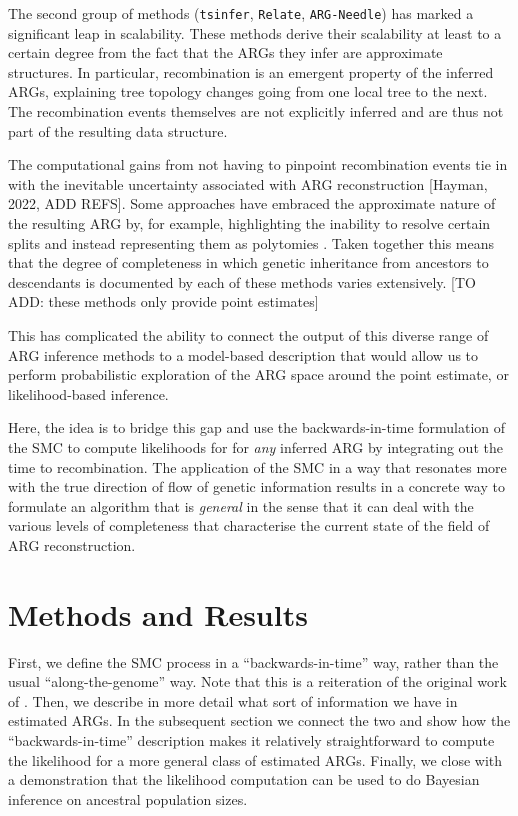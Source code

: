 \documentclass{article}
\newcommand{\tsinfer}[0]{\texttt{tsinfer}}
\newcommand{\argneedle}[0]{\texttt{ARG-Needle}}
\newcommand{\relate}[0]{\texttt{Relate}}
\begin{document}

The second group of methods (\tsinfer, \relate, \argneedle) has marked a significant
leap in scalability. These methods derive their scalability at least to a certain
degree from the fact that the ARGs they infer are approximate structures. In particular,
recombination is an emergent property of the inferred ARGs, explaining tree topology
changes going from one local tree to the next. The recombination events themselves
are not explicitly inferred and are thus not part of the resulting data structure.

The computational gains from not having to pinpoint recombination events tie in
with the inevitable uncertainty associated with ARG reconstruction [Hayman, 2022, ADD REFS].
Some approaches have embraced the approximate nature of the resulting ARG by, for
example, highlighting the inability to resolve certain splits and instead representing
them as polytomies \citep{kelleher_inferring_2019}. Taken together this means that the
degree of completeness in which genetic inheritance from ancestors to descendants is documented
by each of these methods varies extensively.
[TO ADD: these methods only provide point estimates]


This has complicated the ability to connect the output of this diverse range of
ARG inference methods to a model-based description that would allow us to perform
probabilistic exploration of the ARG space around the point estimate,
or likelihood-based inference.

Here, the idea is to bridge this gap and use the backwards-in-time formulation of the SMC
to compute likelihoods for for \textit{any} inferred ARG
by integrating out the time to recombination.
The application of the SMC in a way that resonates more
with the true direction of flow of genetic information
results in a concrete way to formulate an algorithm
that is \textit{general} in the sense that it can deal with the various levels of
completeness that characterise the current state of the field of ARG reconstruction.


\section{Methods and Results}

First, we define the SMC process in a ``backwards-in-time'' way,
rather than the usual ``along-the-genome'' way. 
Note that this is a
reiteration of the original work of \citet{mcvean_approximating_2005}.
Then, we describe
in more detail what sort of information we have in estimated ARGs.
In the subsequent section we connect the two and
show how the ``backwards-in-time'' description
makes it relatively straightforward to compute the likelihood
for a more general class of estimated ARGs.
Finally, we close with a demonstration that the likelihood computation can be used
to do Bayesian inference on ancestral population sizes.
\end{document}
